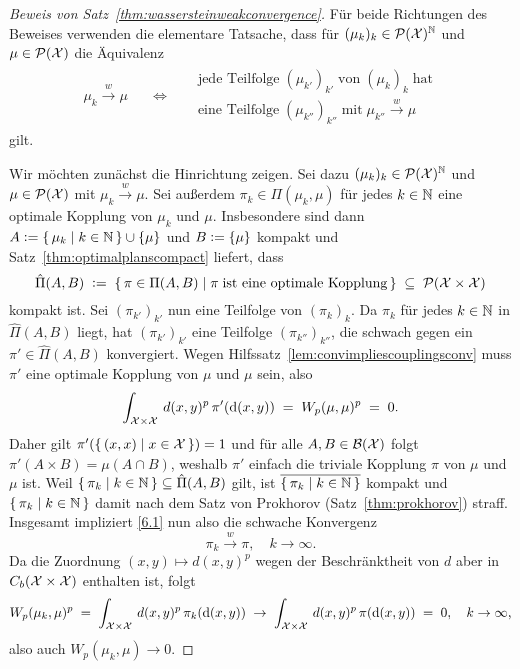 \documentclass[../main/main.tex]{subfiles}
\begin{document}
	\begin{proof}[Beweis von Satz~\ref{thm:wassersteinweakconvergence}]
		Für beide Richtungen des Beweises verwenden die elementare Tatsache, dass für $(\mu_k)_k \in \mathcal{P}(\mathcal{X})^{\mathbb{N}}$ und $\mu \in \mathcal{P}(\mathcal{X})$ die Äquivalenz
		\[ \begin{matrix}
			\mu_k \xrightarrow{w} \mu \quad & \iff & \quad \begin{array}{lr}
				\text{jede Teilfolge} \; (\mu_{k'})_{k'} \; \text{von} \; (\mu_k)_k \; \text{hat} \\
				\text{eine Teilfolge} \; (\mu_{k''})_{k''} \; \text{mit} \; \mu_{k''} \xrightarrow{w} \mu
			\end{array} \label{6.1} \tag{6.1}
		\end{matrix} \]
		gilt.
		
		Wir möchten zunächst die Hinrichtung zeigen. Sei dazu $(\mu_k)_k \in \mathcal{P}(\mathcal{X})^{\mathbb{N}}$ und $\mu \in \mathcal{P}(\mathcal{X})$ mit $\mu_k \xrightarrow{w} \mu$. Sei außerdem $\pi_k \in \Pi(\mu_k, \mu)$ 
		für jedes $k \in \mathbb{N}$ eine optimale Kopplung von $\mu_k$ und $\mu$. 
		Insbesondere sind dann $A \vcentcolon = \left\{\, \mu_k \; \middle| \; k \in \mathbb{N} \,\right\} \cup \left\{\mu\right\}$ und $B \vcentcolon = \left\{\mu\right\}$ kompakt und Satz~\ref{thm:optimalplanscompact} 
		liefert, dass 
		\[ \hat{\Pi}(A, B) \; \vcentcolon = \; \left\{\, \pi \in \Pi(A, B) \; \middle| \; \pi \; \text{ist eine optimale Kopplung} \,\right\} \; \subseteq \; \mathcal{P}(\mathcal{X} \times \mathcal{X}) \]
		kompakt ist. 
		Sei $(\pi_{k'})_{k'}$ nun eine Teilfolge von $(\pi_k)_k$. Da $\pi_k$ für jedes $k \in \mathbb{N}$ in $\hat{\Pi}(A, B)$ liegt, hat $(\pi_{k'})_{k'}$ eine Teilfolge $(\pi_{k''})_{k''}$, 
		die schwach gegen ein $\pi' \in \hat{\Pi}(A, B)$ konvergiert. Wegen Hilfssatz~\ref{lem:convimpliescouplingsconv} muss $\pi'$ eine optimale Kopplung von $\mu$ und $\mu$ sein, also
		\[ \int_{\mathcal{X} \times \mathcal{X}} \, d(x, y)^p \, \pi'(\mathrm{d}(x, y)) \; = \; W_p(\mu, \mu)^p \; = \; 0 \text{.} \]
		Daher gilt $\pi'(\left\{\, (x, x) \; \middle| \; x \in \mathcal{X} \,\right\}) = 1$ und für alle $A, B \in \mathcal{B}(\mathcal{X})$ folgt $\pi'(A \times B) = \mu(A \cap B)$, weshalb $\pi'$ einfach die 
		triviale Kopplung $\pi$ von $\mu$ und $\mu$ ist. Weil $\left\{\, \pi_k \; \middle| \; k \in \mathbb{N} \,\right\} \subseteq \hat{\Pi}(A, B)$ gilt, ist $\overline{\left\{\, \pi_k \; \middle| \; k \in \mathbb{N} \,\right\}}$ kompakt und $\left\{\, \pi_k \; \middle| \; k \in \mathbb{N} \,\right\}$ damit nach
		dem Satz von Prokhorov (Satz~\ref{thm:prokhorov}) straff. Insgesamt impliziert \eqref{6.1} nun also die schwache Konvergenz
		\[ \pi_k \xrightarrow{w} \pi, \quad k \to \infty \text{.} \] 
		Da die Zuordnung $(x, y) \mapsto d(x, y)^p$ wegen der Beschränktheit von $d$ aber in $C_b(\mathcal{X} \times \mathcal{X})$ enthalten ist, folgt 
		\[ W_p(\mu_k, \mu)^p \; = \; \int_{\mathcal{X} \times \mathcal{X}} \, d(x, y)^p \, \pi_k(\mathrm{d}(x, y)) \; \to \; \int_{\mathcal{X} \times \mathcal{X}} \, d(x, y)^p \, \pi(\mathrm{d}(x, y)) \; = \; 0, \quad k \to \infty \text{,} \]
		also auch $W_p(\mu_k, \mu) \to 0$.
		

\end{proof}
\end{document}

